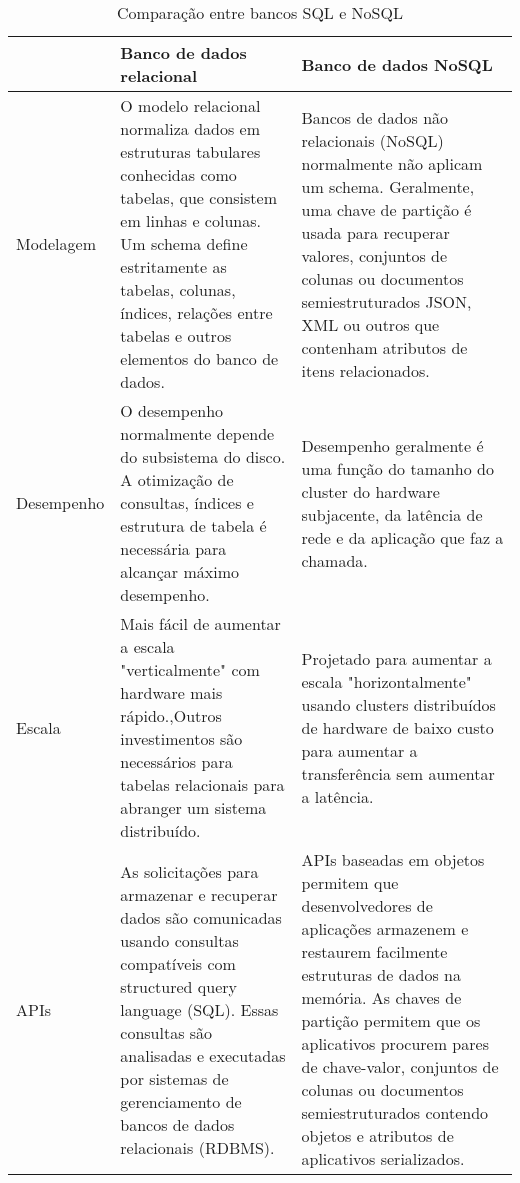 \begin{table}[H]
	\label{tabela-sql-nosql}
	\begin{tabular}{|m{2.5cm}|m{6cm}|m{6cm}|}
		 \hline	
		& Banco de dados relacional                                                                                                                                                                                                                            & Banco de dados NoSQL                                                                                                                                                                                                                                                                                                                \\ \hline 
		Modelagem   & O modelo relacional normaliza dados em estruturas tabulares conhecidas como tabelas, que consistem em linhas e colunas. Um schema define estritamente as tabelas, colunas, índices, relações entre tabelas e outros elementos do banco de dados.     & Bancos de dados não relacionais (NoSQL) normalmente não aplicam um schema. Geralmente, uma chave de partição é usada para recuperar valores, conjuntos de colunas ou documentos semiestruturados JSON, XML ou outros que contenham atributos de itens relacionados.                                                                  \\ \hline 
		Desempenho  & O desempenho normalmente depende do subsistema do disco. A otimização de consultas, índices e estrutura de tabela é necessária para alcançar máximo desempenho.                                                                                      & Desempenho geralmente é uma função do tamanho do cluster do hardware subjacente, da latência de rede e da aplicação que faz a chamada.  \\ \hline 
		Escala      & Mais fácil de aumentar a escala "verticalmente" com hardware mais rápido.,Outros investimentos são necessários para tabelas relacionais para abranger um sistema distribuído.                                                                        & Projetado para aumentar a escala "horizontalmente" usando clusters distribuídos de hardware de baixo custo para aumentar a transferência sem aumentar a latência.                                \\ \hline 
		APIs & As solicitações para armazenar e recuperar dados são comunicadas usando consultas compatíveis com structured query language (SQL). Essas consultas são analisadas e executadas por sistemas de gerenciamento de bancos de dados relacionais (RDBMS). & APIs baseadas em objetos permitem que desenvolvedores de aplicações armazenem e restaurem facilmente estruturas de dados na memória. As chaves de partição permitem que os aplicativos procurem pares de chave-valor, conjuntos de colunas ou documentos semiestruturados contendo objetos e atributos de aplicativos serializados. \\ \hline 
	\end{tabular}
		\caption{Comparação entre bancos SQL e NoSQL}
\end{table}

